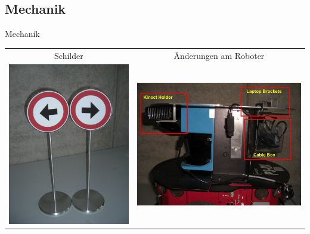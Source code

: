 \documentclass{VLKlauck}
\begin{document}
	\subsection{Mechanik}
	\begin{frame}{Mechanik}
		\begin{tabular}{cc}
			Schilder 								   & Änderungen am Roboter\\
			\includegraphics[scale=0.07]{signs.jpg}  & \includegraphics[scale=0.1]{laptop_stand_side.png}\\	
		\end{tabular}
	\end{frame} 
	  
\end{document}

